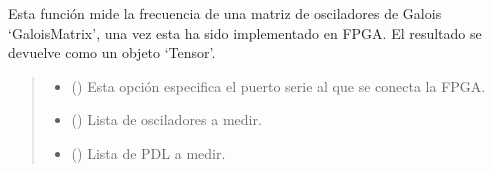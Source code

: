 \documentclass[letterpaper,10pt,english]{sphinxmanual}
\begin{document}
\begin{fulllineitems}
\begin{fulllineitems}
\label{\detokenize{fpga.ring_osc:fpga.ring_osc.GaloisMatrix.medir}}
\pysigstartsignatures
{}
\pysigstopsignatures
\sphinxAtStartPar
Esta función mide la frecuencia de una matriz de osciladores de Galois ‘GaloisMatrix’, una vez esta ha sido implementado en FPGA. El resultado se devuelve como un objeto ‘Tensor’.
\begin{quote}\begin{description}
\begin{itemize}
\item {} 
\sphinxAtStartPar
{} () \textendash{} Esta opción especifica el puerto serie al que se conecta la
FPGA.

\item {} 
\sphinxAtStartPar
{} (\sphinxstyleliteralemphasis{\sphinxupquote{ | }}\sphinxstyleliteralemphasis{\sphinxupquote{(}}\sphinxstyleliteralemphasis{\sphinxupquote{)}}) \textendash{} Lista de osciladores a medir.

\item {} 
\sphinxAtStartPar
{} (\sphinxstyleliteralemphasis{\sphinxupquote{ | }}\sphinxstyleliteralemphasis{\sphinxupquote{(}}\sphinxstyleliteralemphasis{\sphinxupquote{)}}) \textendash{} Lista de PDL a medir.


\end{itemize}
\end{description}
\end{quote}
\end{fulllineitems}
\end{fulllineitems}
\end{document}
